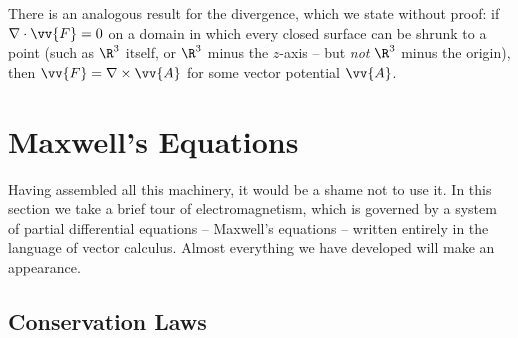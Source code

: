 \begin{center}
\end{center}

There is an analogous result for the divergence, which we state without proof: if $\nabla \cdot \vv{F} = 0$ on a domain in which every closed surface can be shrunk to a point (such as $\R^3$ itself, or $\R^3$ minus the $z$-axis -- but \emph{not} $\R^3$ minus the origin), then $\vv{F} = \nabla \times \vv{A}$ for some vector potential $\vv{A}$.
\section{Maxwell's Equations}

Having assembled all this machinery, it would be a shame not to use it. In this section we take a brief tour of electromagnetism, which is governed by a system of partial differential equations -- Maxwell's equations -- written entirely in the language of vector calculus. Almost everything we have developed will make an appearance.

\subsection{Conservation Laws}

